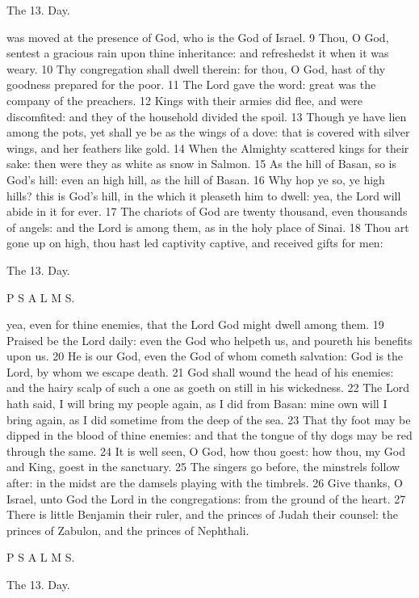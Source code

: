 The 13. Day.

was moved at the presence of God, who is the God of Israel. 9 Thou, O God, sentest a gracious rain upon thine inheritance: and refreshedst it when it was weary. 10 Thy congregation shall dwell therein: for thou, O God, hast of thy goodness prepared for the poor. 11 The Lord gave the word: great was the company of the preachers. 12 Kings with their armies did flee, and were discomfited: and they of the household divided the spoil. 13 Though ye have lien among the pots, yet shall ye be as the wings of a dove: that is covered with silver wings, and her feathers like gold. 14 When the Almighty scattered kings for their sake: then were they as white as snow in Salmon. 15 As the hill of Basan, so is God’s hill: even an high hill, as the hill of Basan. 16 Why hop ye so, ye high hills? this is God’s hill, in the which it pleaseth him to dwell: yea, the Lord will abide in it for ever. 17 The chariots of God are twenty thousand, even thousands of angels: and the Lord is among them, as in the holy place of Sinai. 18 Thou art gone up on high, thou hast led captivity captive, and received gifts for men:

The 13. Day.

P S A L M S.

yea, even for thine enemies, that the Lord God might dwell among them. 19 Praised be the Lord daily: even the God who helpeth us, and poureth his benefits upon us. 20 He is our God, even the God of whom cometh salvation: God is the Lord, by whom we escape death. 21 God shall wound the head of his enemies: and the hairy scalp of such a one as goeth on still in his wickedness. 22 The Lord hath said, I will bring my people again, as I did from Basan: mine own will I bring again, as I did sometime from the deep of the sea. 23 That thy foot may be dipped in the blood of thine enemies: and that the tongue of thy dogs may be red through the same. 24 It is well seen, O God, how thou goest: how thou, my God and King, goest in the sanctuary. 25 The singers go before, the minstrels follow after: in the midst are the damsels playing with the timbrels. 26 Give thanks, O Israel, unto God the Lord in the congregations: from the ground of the heart. 27 There is little Benjamin their ruler, and the princes of Judah their counsel: the princes of Zabulon, and the princes of Nephthali.

P S A L M S.

The 13. Day.

